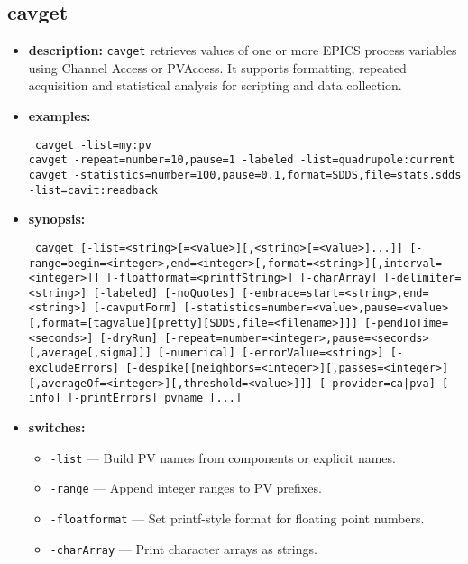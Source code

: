 %
%
\begin{latexonly}
\newpage
\end{latexonly}

\subsection{cavget}
\label{cavget}

\begin{itemize}
\item {\bf description:}
\verb+cavget+ retrieves values of one or more EPICS process variables using Channel Access or PVAccess.
It supports formatting, repeated acquisition and statistical analysis for scripting and data collection.
\item {\bf examples:}
\begin{flushleft}{\tt
cavget -list=my:pv\\
cavget -repeat=number=10,pause=1 -labeled -list=quadrupole:current\\
cavget -statistics=number=100,pause=0.1,format=SDDS,file=stats.sdds -list=cavit:readback
}\end{flushleft}
\item {\bf synopsis:}
\begin{flushleft}{\tt
cavget [-list=<string>[=<value>][,<string>[=<value>]...]]\
[-range=begin=<integer>,end=<integer>[,format=<string>][,interval=<integer>]]\
[-floatformat=<printfString>] [-charArray] [-delimiter=<string>] [-labeled]\
[-noQuotes] [-embrace=start=<string>,end=<string>] [-cavputForm]\
[-statistics=number=<value>,pause=<value>[,format=[tagvalue][pretty][SDDS,file=<filename>]]]\
[-pendIoTime=<seconds>] [-dryRun] [-repeat=number=<integer>,pause=<seconds>[,average[,sigma]]]\
[-numerical] [-errorValue=<string>] [-excludeErrors]\
[-despike[[neighbors=<integer>][,passes=<integer>][,averageOf=<integer>][,threshold=<value>]]]\
[-provider={ca|pva}] [-info] [-printErrors] pvname [...]
}\end{flushleft}
\item {\bf switches:}
  \begin{itemize}
    \item {\tt -list} --- Build PV names from components or explicit names.
    \item {\tt -range} --- Append integer ranges to PV prefixes.
    \item {\tt -floatformat} --- Set printf-style format for floating point numbers.
    \item {\tt -charArray} --- Print character arrays as strings.

\end{itemize}
\end{itemize}

